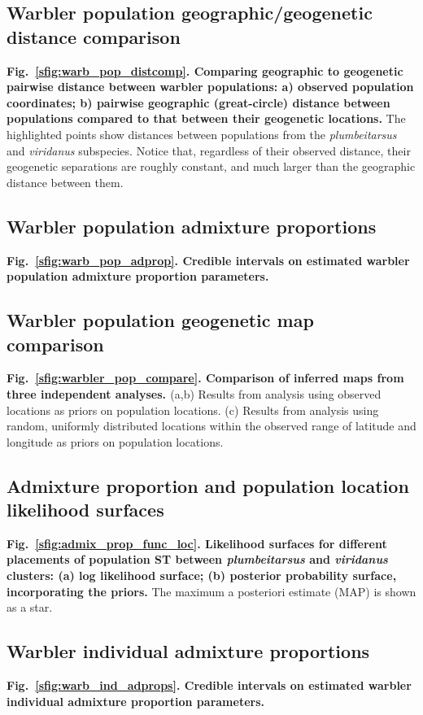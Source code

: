 \documentclass[10pt,letterpaper]{article}
\begin{document}
\subsection*{Warbler population geographic/geogenetic distance comparison}
\label{warb_pop_distcomp}
{\bf{Fig.\ \ref{sfig:warb_pop_distcomp}. Comparing geographic to geogenetic pairwise distance between warbler populations: a) observed population coordinates; b) pairwise geographic (great-circle) distance between populations compared to that between their geogenetic locations.}} The highlighted points show distances between populations from the \textit{plumbeitarsus} and \textit{viridanus} subspecies.  Notice that, regardless of their observed distance, their geogenetic separations are roughly constant, and much larger than the geographic distance between them.

\subsection*{Warbler population admixture proportions}
\label{warb_pop_adprop}
{\bf{Fig.\ \ref{sfig:warb_pop_adprop}. Credible intervals on estimated warbler population admixture proportion parameters.}}

\subsection*{Warbler population geogenetic map comparison}
\label{warbler_pop_compare}
{\bf{Fig.\ \ref{sfig:warbler_pop_compare}. Comparison of inferred maps from three independent analyses.	}} (a,b) Results from analysis using observed locations as priors on population locations.  (c) Results from analysis using random, uniformly distributed locations within the observed range of latitude and longitude as priors on population locations.

\subsection*{Admixture proportion and population location likelihood surfaces}
\label{admix_prop_func_loc_lnl}
{\bf{Fig.\ \ref{sfig:admix_prop_func_loc}. Likelihood surfaces for different placements of population ST between \textit{plumbeitarsus} and \textit{viridanus} clusters: (a) log likelihood surface; (b) posterior probability surface, incorporating the priors.}}  The maximum a posteriori estimate (MAP) is shown as a star. 

\subsection*{Warbler individual admixture proportions}
\label{warb_ind_adprops}
{\bf{Fig.\ \ref{sfig:warb_ind_adprops}. Credible intervals on estimated warbler individual admixture proportion parameters.}}
\end{document}
